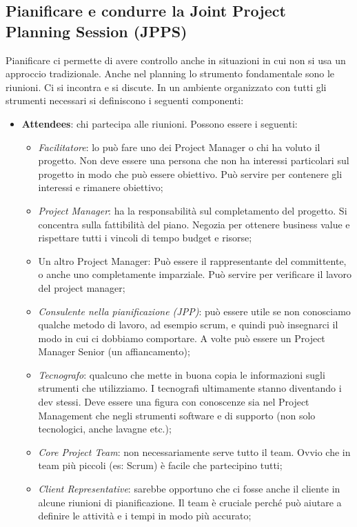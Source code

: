 \subsection{Pianificare e condurre la Joint Project Planning Session (JPPS)}
Pianificare ci permette di avere controllo anche in situazioni in cui non si usa un approccio tradizionale. Anche nel planning lo strumento fondamentale sono le riunioni. Ci si incontra e si discute. In un ambiente organizzato con tutti gli strumenti necessari si definiscono i seguenti componenti:
\begin{itemize}
	\item \textbf{Attendees}: chi partecipa alle riunioni. Possono essere i seguenti:
	\begin{itemize}
		\item \textit{Facilitatore}: lo può fare uno dei Project Manager o chi ha voluto il progetto. Non deve essere una persona che non ha interessi particolari sul progetto in modo che può essere obiettivo. Può servire per contenere gli interessi e rimanere obiettivo;
		\item \textit{Project Manager}: ha la responsabilità sul completamento del progetto. Si concentra sulla fattibilità del piano. Negozia per ottenere business value e rispettare tutti i vincoli di tempo budget e risorse;
		\item Un altro Project Manager: Può essere il rappresentante del committente, o anche uno completamente imparziale. Può servire per verificare il lavoro del project manager;
		\item \textit{Consulente nella pianificazione (JPP)}: può essere utile se non conosciamo qualche metodo di lavoro, ad esempio scrum, e quindi può insegnarci il modo in cui ci dobbiamo comportare. A volte può essere un Project Manager Senior (un affiancamento);
		\item \textit{Tecnografo}: qualcuno che mette in buona copia le informazioni sugli strumenti che utilizziamo. I tecnografi ultimamente stanno diventando i dev stessi. Deve essere una figura con conoscenze sia nel Project Management che negli strumenti software e di supporto (non solo tecnologici, anche lavagne etc.);
		\item \textit{Core Project Team}: non necessariamente serve tutto il team. Ovvio che in team più piccoli (es: Scrum) è facile che partecipino tutti;
		\item \textit{Client Representative}: sarebbe opportuno che ci fosse anche il cliente in alcune riunioni di pianificazione. Il team è cruciale perché può aiutare a definire le attività e i tempi in modo più accurato;

\end{itemize}
\end{itemize}
